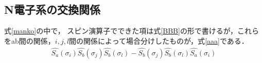\documentclass{article}
\begin{document}







\subsection{N電子系の交換関係}
式\eqref{manko}の中で，
スピン演算子でできた項は式\eqref{BBB}の形で書けるが，これらをab間の関係，$i,j,l$間の関係によって場合分けしたものが，式\eqref{aaa}である．
\begin{equation}
\begin{split}
\label{BBB}
{\hat{S_a}}(\sigma_i) \hat{S_{b}}{(\sigma_j)} \hat{S_{b}}{(\sigma_l)} -  \hat{S_{b}}{(\sigma_j)} \hat{S_{b}}{(\sigma_l)} {\hat{S_a}}(\sigma_i)\\
\end{split}
\end{equation}
\end{document}
